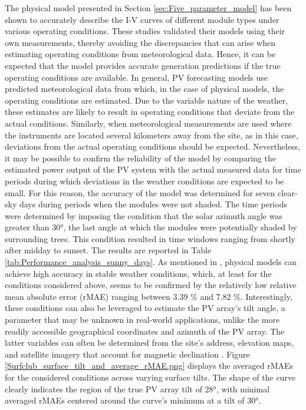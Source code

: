 The physical model presented in Section \ref{sec:Five_parameter_model} has been shown
to accurately describe the I-V curves of different module types \cite{LoBrano, Orioli}
under various operating conditions. These studies validated their models using
their own measurements, thereby avoiding the discrepancies that can arise
when estimating operating conditions from meteorological data. Hence,
it can be expected that the model provides accurate generation predictions
if the true operating conditions are available. In general, PV forecasting
models use predicted meteorological
data from which, in the case of physical models, the operating conditions are
estimated. Due to the variable nature of the weather, these estimates are likely
to result in operating conditions that deviate from the actual conditions.
Similarly, when meteorological measurements are used where the instruments are
located several kilometers away from the site, as in this case, deviations from
the actual operating conditions should be expected.
Nevertheless, it may be possible to confirm the reliability of the model by
comparing the estimated power output of the PV system with the actual measured
data for time periods during which deviations in the weather conditions are
expected to be small. For this reason, the accuracy of the model was determined
for seven clear-sky days during periods when the modules were not shaded. The
time periods were determined by imposing the condition that the solar azimuth
angle was greater than 30°, the last angle at which the modules were potentially
shaded by surrounding trees. This condition resulted in time windows ranging
from shortly after midday to sunset. The results are reported in Table
\ref{tab:Performance_analysis_sunny_days}. As mentioned in \cite{Iheanetu2022},
physical models can achieve high accuracy in stable weather conditions, which,
at least for the conditions considered above, seems to be confirmed by the
relatively low relative mean absolute error (rMAE) ranging between 3.39 \%
and 7.82 \%. Interestingly, these conditions can also be leveraged to estimate the PV array's
tilt angle, a parameter that may be unknown in real-world applications, unlike the
more readily accessible geographical coordinates and azimuth of the PV array.
The latter variables can often be determined from the site's address, elevation
maps, and satellite imagery that account for magnetic declination \cite[p. 92]{Mayfield}.
Figure \ref{Surfclub_surface_tilt_and_average_rMAE.png} displays the averaged rMAEs
for the considered conditions across varying surface tilts. The shape of the curve
clearly indicates the region of the true PV array tilt of 28°, with minimal averaged
rMAEs centered around the curve's minimum at a tilt of 30°.

